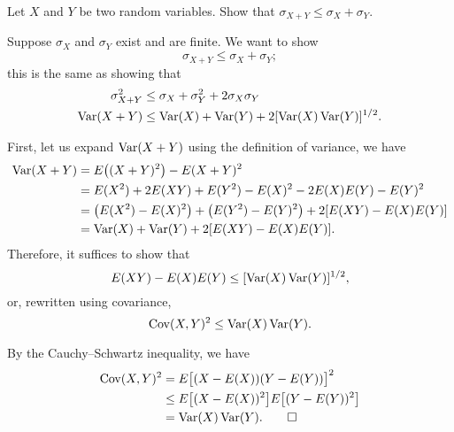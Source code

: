 \begin{problem}
  Let \(X\) and \(Y\) be two random variables. Show that
  \(\sigma_{X+Y}\leq\sigma_X+\sigma_Y\).
\end{problem}
\begin{solution}
  Suppose \(\sigma_X\) and \(\sigma_Y\) exist and are finite. We want to
  show
  \[
    \sigma_{X+Y}\leq\sigma_X+\sigma_Y;
  \]
  this is the same as showing that
  \begin{align*}
    \sigma_{X+Y}^2
    &\leq\sigma_X+\sigma_Y^2+2\sigma_X\sigma_Y\\
    \operatorname{Var}(X+Y)&\leq\operatorname{Var}(X)+\operatorname{Var}(Y)+2[\operatorname{Var}(X)\operatorname{Var}(Y)]^{1/2}.
  \end{align*}

  First, let us expand \(\operatorname{Var}(X+Y)\) using the definition of variance, we
  have
  \begin{align*}
    \operatorname{Var}(X+Y)
    &=E\bigl((X+Y)^2\bigr)-E(X+Y)^2\\
    &=E(X^2)+2E(XY)+E(Y^2)-E(X)^2-2E(X)E(Y)-E(Y)^2\\
    &=\bigl(E(X^2)-E(X)^2\bigr)+\bigl(E(Y^2)-E(Y)^2\bigr)+2[E(XY)-E(X)E(Y)]\\
    &=\operatorname{Var}(X)+\operatorname{Var}(Y)+2[E(XY)-E(X)E(Y)].
  \end{align*}
  Therefore, it suffices to show that
  \[
    E(XY)-E(X)E(Y)\leq [\operatorname{Var}(X)\operatorname{Var}(Y)]^{1/2},
  \]
  or, rewritten using covariance,
  \[
    \operatorname{Cov}(X,Y)^2\leq\operatorname{Var}(X)\operatorname{Var}(Y).
  \]

  By the Cauchy--Schwartz inequality, we have
  \begin{align*}
    \operatorname{Cov}(X,Y)^2
    &=E\bigl[(X-E(X))(Y-E(Y))\bigr]^2\\
    &\leq E\bigl[(X-E(X))^2\bigr]
      E\bigl[(Y-E(Y))^2\bigr]\\
    &=\operatorname{Var}(X)\operatorname{Var}(Y).\qedhere
  \end{align*}
\end{solution}

